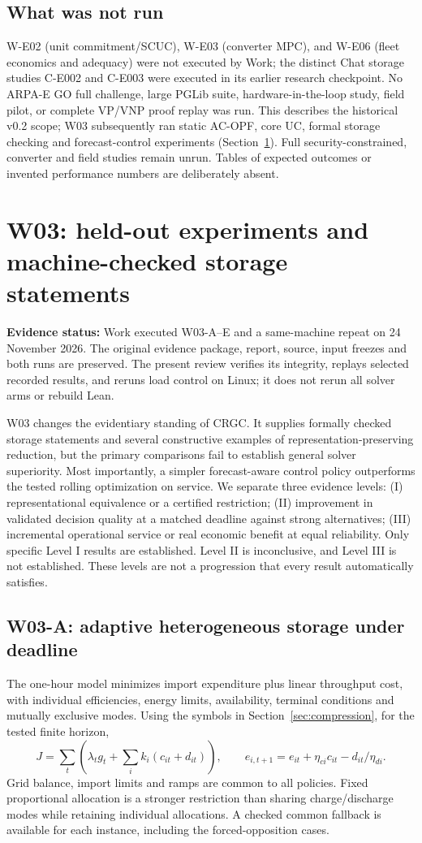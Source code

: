 \documentclass[11pt,letterpaper]{article}
\newcommand{\status}[1]{\textbf{Evidence status:} #1}
\begin{document}
\subsection{What was not run}
W-E02 (unit commitment/SCUC), W-E03 (converter MPC), and W-E06 (fleet economics and adequacy) were not executed by Work; the distinct Chat storage studies C-E002 and C-E003 were executed in its earlier research checkpoint. No ARPA-E GO full challenge, large PGLib suite, hardware-in-the-loop study, field pilot, or complete VP/VNP proof replay was run. This describes the historical v0.2 scope; W03 subsequently ran static AC-OPF, core UC, formal storage checking and forecast-control experiments (Section~\ref{sec:w03results}). Full security-constrained, converter and field studies remain unrun. Tables of expected outcomes or invented performance numbers are deliberately absent.

\section{W03: held-out experiments and machine-checked storage statements}
\label{sec:w03results}
\status{Work executed W03-A--E and a same-machine repeat on 24 November 2026. The original evidence package, report, source, input freezes and both runs are preserved. The present review verifies its integrity, replays selected recorded results, and reruns load control on Linux; it does not rerun all solver arms or rebuild Lean.}\cite{w03packet,w03review}

W03 changes the evidentiary standing of CRGC. It supplies formally checked storage statements and several constructive examples of representation-preserving reduction, but the primary comparisons fail to establish general solver superiority. Most importantly, a simpler forecast-aware control policy outperforms the tested rolling optimization on service. We separate three evidence levels: (I) representational equivalence or a certified restriction; (II) improvement in validated decision quality at a matched deadline against strong alternatives; (III) incremental operational service or real economic benefit at equal reliability. Only specific Level I results are established. Level II is inconclusive, and Level III is not established. These levels are not a progression that every result automatically satisfies.

\subsection{W03-A: adaptive heterogeneous storage under deadline}
The one-hour model minimizes import expenditure plus linear throughput cost, with individual efficiencies, energy limits, availability, terminal conditions and mutually exclusive modes. Using the symbols in Section~\ref{sec:compression}, for the tested finite horizon,
\[
 J=\sum_t\left(\lambda_t g_t+\sum_i k_i(c_{it}+d_{it})\right),\qquad
 e_{i,t+1}=e_{it}+\eta_{ci}c_{it}-d_{it}/\eta_{di}.
\]
Grid balance, import limits and ramps are common to all policies. Fixed proportional allocation is a stronger restriction than sharing charge/discharge modes while retaining individual allocations. A checked common fallback is available for each instance, including the forced-opposition cases.
\end{document}
